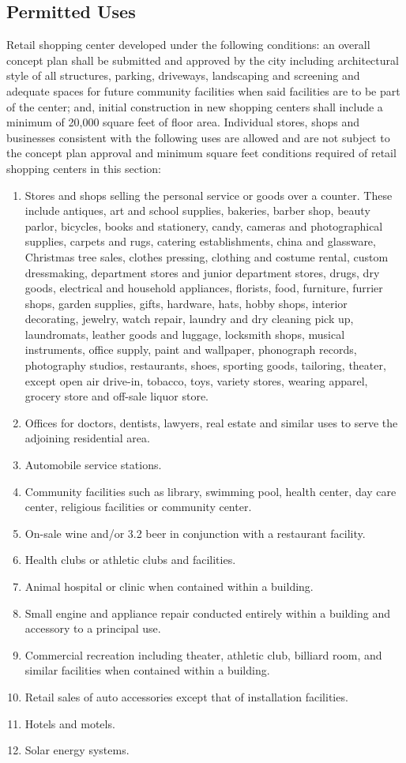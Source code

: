 \subsection{Permitted Uses}
Retail shopping center developed under the following conditions: an overall concept plan shall be submitted and approved by the city including architectural style of all structures, parking, driveways, landscaping and screening and adequate spaces for future community facilities when said facilities are to be part of the center; and, initial construction in new shopping centers shall include a minimum of 20,000 square feet of floor area. Individual stores, shops and businesses consistent with the following uses are allowed and are not subject to the concept plan approval and minimum square feet conditions required of retail shopping centers in this section:
\begin{enumerate}[{\indent}1)]
    \item Stores and shops selling the personal service or goods over a counter.  These include antiques, art and school supplies, bakeries, barber shop, beauty parlor, bicycles, books and stationery, candy, cameras and photographical supplies, carpets and rugs, catering establishments, china and glassware, Christmas tree sales, clothes pressing, clothing and costume rental, custom dressmaking, department stores and junior department stores, drugs, dry goods, electrical and household appliances, florists, food, furniture, furrier shops, garden supplies, gifts, hardware, hats, hobby shops, interior decorating, jewelry, watch repair, laundry and dry cleaning pick up, laundromats, leather goods and luggage, locksmith shops, musical instruments, office supply, paint and wallpaper, phonograph records, photography studios, restaurants, shoes, sporting goods, tailoring, theater, except open air drive-in, tobacco, toys, variety stores, wearing apparel, grocery store and off-sale liquor store.
    \item Offices for doctors, dentists, lawyers, real estate and similar uses to serve the adjoining residential area.
    \item Automobile service stations.
    \item Community facilities such as library, swimming pool, health center, day care center, religious facilities or community center.
    \item On-sale wine and/or 3.2 beer in conjunction with a restaurant facility.
    \item Health clubs or athletic clubs and facilities.
    \item Animal hospital or clinic when contained within a building.
    \item Small engine and appliance repair conducted entirely within a building and accessory to a principal use.
    \item Commercial recreation including theater, athletic club, billiard room, and similar facilities when contained within a building.
    \item Retail sales of auto accessories except that of installation facilities.
    \item Hotels and motels.  
    \item Solar energy systems.
\end{enumerate}
